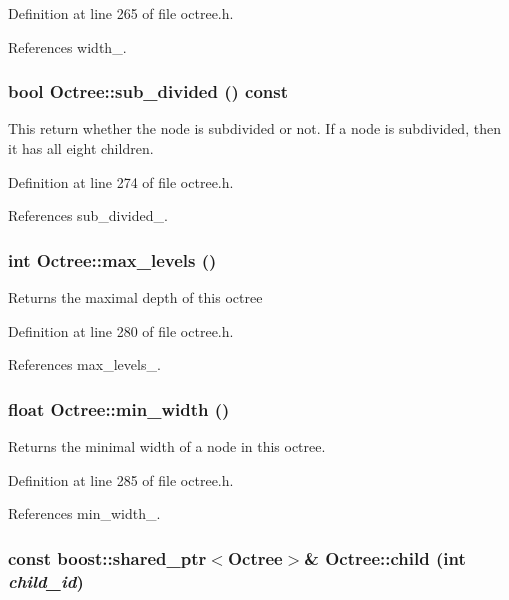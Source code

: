 Definition at line 265 of file octree.h.

References width\_\-.\hypertarget{class_octree_c05628e77200a5243dd1b0d84332ef39}{
\subsubsection[sub\_\-divided]{\setlength{\rightskip}{0pt plus 5cm}bool Octree::sub\_\-divided () const}}
\label{class_octree_c05628e77200a5243dd1b0d84332ef39}


This return whether the node is subdivided or not. If a node is subdivided, then it has all eight children. 

Definition at line 274 of file octree.h.

References sub\_\-divided\_\-.\hypertarget{class_octree_f514ecc29e3882b0c2e46ccb5ba4fcd9}{
\subsubsection[max\_\-levels]{\setlength{\rightskip}{0pt plus 5cm}int Octree::max\_\-levels ()}}
\label{class_octree_f514ecc29e3882b0c2e46ccb5ba4fcd9}


Returns the maximal depth of this octree 

Definition at line 280 of file octree.h.

References max\_\-levels\_\-.\hypertarget{class_octree_9c9093d2ed7caa8ac16a1f230a66428f}{
\subsubsection[min\_\-width]{\setlength{\rightskip}{0pt plus 5cm}float Octree::min\_\-width ()}}
\label{class_octree_9c9093d2ed7caa8ac16a1f230a66428f}


Returns the minimal width of a node in this octree. 

Definition at line 285 of file octree.h.

References min\_\-width\_\-.\hypertarget{class_octree_211c7b90c150193b6124c05229eb2abb}{
\subsubsection[child]{\setlength{\rightskip}{0pt plus 5cm}const boost::shared\_\-ptr$<${\bf Octree}$>$\& Octree::child (int {\em child\_\-id})}}
\label{class_octree_211c7b90c150193b6124c05229eb2abb}


